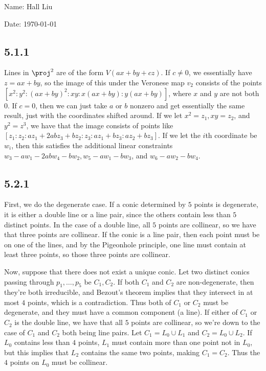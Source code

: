 \documentclass{article}
\begin{document}
Name: Hall Liu

Date: \today 
\vspace{1.5cm}
\subsection*{5.1.1}
Lines in $\proj^2$ are of the form $V(ax+by+cz)$. If $c\neq0$, we essentially have $z=ax+by$, so the image of this under the Veronese map $v_2$ consists of the points $[x^2:y^2:(ax+by)^2:xy:x(ax+by):y(ax+by)]$, where $x$ and $y$ are not both $0$. If $c=0$, then we can just take $a$ or $b$ nonzero and get essentially the same result, just with the coordinates shifted around. If we let $x^2=z_1,xy=z_2$, and $y^2=z^3$, we have that the image consists of points like $[z_1:z_2:az_1+2abz_3+bz_2:z_3:az_1+bz_3:az_2+bz_3]$. If we let the $i$th coordinate be $w_i$, then this satisfies the additional linear constraints $w_3-aw_1-2abw_4-bw_2,w_5-aw_1-bw_3$, and $w_6-aw_2-bw_4$.
\subsection*{5.2.1}
First, we do the degenerate case. If a conic determined by $5$ points is degenerate, it is either a double line or a line pair, since the others contain less than $5$ distinct points. In the case of a double line, all $5$ points are collinear, so we have that three points are collinear. If the conic is a line pair, then each point must be on one of the lines, and by the Pigeonhole principle, one line must contain at least three points, so those three points are collinear.

Now, suppose that there does not exist a unique conic. Let two distinct conics passing through $p_1,\ldots,p_5$ be $C_1,C_2$. If both $C_1$ and $C_2$ are non-degenerate, then they're both irreducible, and Bezout's theorem implies that they intersect in at most $4$ points, which is a contradiction. Thus both of $C_1$ or $C_2$ must be degenerate, and they must have a common component (a line). If either of $C_1$ or $C_2$ is the double line, we have that all $5$ points are collinear, so we're down to the case of $C_1$ and $C_2$ both being line pairs. Let $C_1=L_0\cup L_1$ and $C_2=L_0\cup L_2$. If $L_0$ contains less than $4$ points, $L_1$ must contain more than one point not in $L_0$, but this implies that $L_2$ contains the same two points, making $C_1=C_2$. Thus the $4$ points on $L_0$ must be collinear.
\end{document}
